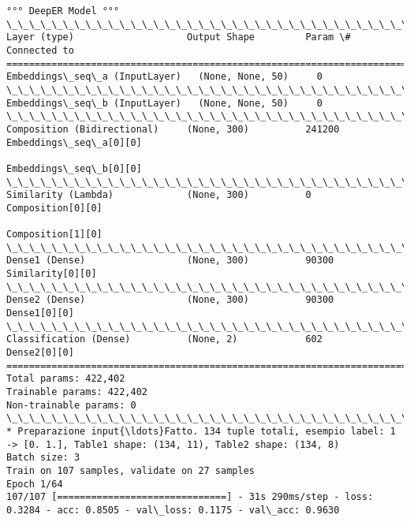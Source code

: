 \documentclass[11pt]{article}
\begin{document}
\begin{Verbatim}[commandchars=\\\{\}]
°°° DeepER Model °°°
\_\_\_\_\_\_\_\_\_\_\_\_\_\_\_\_\_\_\_\_\_\_\_\_\_\_\_\_\_\_\_\_\_\_\_\_\_\_\_\_\_\_\_\_\_\_\_\_\_\_\_\_\_\_\_\_\_\_\_\_\_\_\_\_\_\_\_\_\_\_\_\_\_\_\_\_\_\_\_\_\_\_\_\_\_\_\_\_\_\_\_\_\_\_\_\_\_\_
Layer (type)                    Output Shape         Param \#     Connected to                     
==================================================================================================
Embeddings\_seq\_a (InputLayer)   (None, None, 50)     0                                            
\_\_\_\_\_\_\_\_\_\_\_\_\_\_\_\_\_\_\_\_\_\_\_\_\_\_\_\_\_\_\_\_\_\_\_\_\_\_\_\_\_\_\_\_\_\_\_\_\_\_\_\_\_\_\_\_\_\_\_\_\_\_\_\_\_\_\_\_\_\_\_\_\_\_\_\_\_\_\_\_\_\_\_\_\_\_\_\_\_\_\_\_\_\_\_\_\_\_
Embeddings\_seq\_b (InputLayer)   (None, None, 50)     0                                            
\_\_\_\_\_\_\_\_\_\_\_\_\_\_\_\_\_\_\_\_\_\_\_\_\_\_\_\_\_\_\_\_\_\_\_\_\_\_\_\_\_\_\_\_\_\_\_\_\_\_\_\_\_\_\_\_\_\_\_\_\_\_\_\_\_\_\_\_\_\_\_\_\_\_\_\_\_\_\_\_\_\_\_\_\_\_\_\_\_\_\_\_\_\_\_\_\_\_
Composition (Bidirectional)     (None, 300)          241200      Embeddings\_seq\_a[0][0]           
                                                                 Embeddings\_seq\_b[0][0]           
\_\_\_\_\_\_\_\_\_\_\_\_\_\_\_\_\_\_\_\_\_\_\_\_\_\_\_\_\_\_\_\_\_\_\_\_\_\_\_\_\_\_\_\_\_\_\_\_\_\_\_\_\_\_\_\_\_\_\_\_\_\_\_\_\_\_\_\_\_\_\_\_\_\_\_\_\_\_\_\_\_\_\_\_\_\_\_\_\_\_\_\_\_\_\_\_\_\_
Similarity (Lambda)             (None, 300)          0           Composition[0][0]                
                                                                 Composition[1][0]                
\_\_\_\_\_\_\_\_\_\_\_\_\_\_\_\_\_\_\_\_\_\_\_\_\_\_\_\_\_\_\_\_\_\_\_\_\_\_\_\_\_\_\_\_\_\_\_\_\_\_\_\_\_\_\_\_\_\_\_\_\_\_\_\_\_\_\_\_\_\_\_\_\_\_\_\_\_\_\_\_\_\_\_\_\_\_\_\_\_\_\_\_\_\_\_\_\_\_
Dense1 (Dense)                  (None, 300)          90300       Similarity[0][0]                 
\_\_\_\_\_\_\_\_\_\_\_\_\_\_\_\_\_\_\_\_\_\_\_\_\_\_\_\_\_\_\_\_\_\_\_\_\_\_\_\_\_\_\_\_\_\_\_\_\_\_\_\_\_\_\_\_\_\_\_\_\_\_\_\_\_\_\_\_\_\_\_\_\_\_\_\_\_\_\_\_\_\_\_\_\_\_\_\_\_\_\_\_\_\_\_\_\_\_
Dense2 (Dense)                  (None, 300)          90300       Dense1[0][0]                     
\_\_\_\_\_\_\_\_\_\_\_\_\_\_\_\_\_\_\_\_\_\_\_\_\_\_\_\_\_\_\_\_\_\_\_\_\_\_\_\_\_\_\_\_\_\_\_\_\_\_\_\_\_\_\_\_\_\_\_\_\_\_\_\_\_\_\_\_\_\_\_\_\_\_\_\_\_\_\_\_\_\_\_\_\_\_\_\_\_\_\_\_\_\_\_\_\_\_
Classification (Dense)          (None, 2)            602         Dense2[0][0]                     
==================================================================================================
Total params: 422,402
Trainable params: 422,402
Non-trainable params: 0
\_\_\_\_\_\_\_\_\_\_\_\_\_\_\_\_\_\_\_\_\_\_\_\_\_\_\_\_\_\_\_\_\_\_\_\_\_\_\_\_\_\_\_\_\_\_\_\_\_\_\_\_\_\_\_\_\_\_\_\_\_\_\_\_\_\_\_\_\_\_\_\_\_\_\_\_\_\_\_\_\_\_\_\_\_\_\_\_\_\_\_\_\_\_\_\_\_\_
* Preparazione input{\ldots}Fatto. 134 tuple totali, esempio label: 1 -> [0. 1.], Table1 shape: (134, 11), Table2 shape: (134, 8)
Batch size: 3
Train on 107 samples, validate on 27 samples
Epoch 1/64
107/107 [==============================] - 31s 290ms/step - loss: 0.3284 - acc: 0.8505 - val\_loss: 0.1175 - val\_acc: 0.9630


\end{Verbatim}
\end{document}
